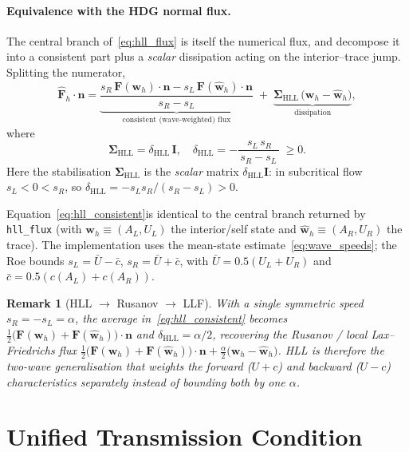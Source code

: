 \documentclass[11pt]{article}
\newtheorem{remark}[theorem]{Remark}
\begin{document}
\paragraph{Equivalence with the HDG normal flux.}
The central branch of~\eqref{eq:hll_flux} is itself the numerical flux, and decompose it into a consistent part plus a \emph{scalar}
dissipation acting on the interior--trace jump. Splitting the
numerator,
\begin{equation}
  \widehat{\mathbf F}_h\cdot\bm n
  =
  \underbrace{\frac{s_R\,\mathbf F(\mathbf w_h)\cdot\bm n
            -s_L\,\mathbf F(\widehat{\mathbf w}_h)\cdot\bm n}{s_R-s_L}}
            _{\text{consistent (wave-weighted) flux}}
  \;+\; \underbrace{\bm\Sigma_{\mathrm{HLL}}\,
  \bigl(\mathbf w_h-\widehat{\mathbf w}_h\bigr)}_{\text{dissipation}}, 
  \label{eq:hll_consistent}
\end{equation}
where $$
  \bm\Sigma_{\mathrm{HLL}}=\delta_{\mathrm{HLL}}\,\mathbf I,
  \quad
  \delta_{\mathrm{HLL}}= -\frac{\,s_L\,s_R}{\,s_R-s_L\,}\;\ge 0 .$$
Here the stabilisation $\bm\Sigma_{\mathrm{HLL}}$ is the \emph{scalar} matrix
$\delta_{\mathrm{HLL}}\mathbf I$: in subcritical flow $s_L<0<s_R$, so
$\delta_{\mathrm{HLL}}=-s_Ls_R/(s_R-s_L)>0$. 

Equation~\eqref{eq:hll_consistent}is identical to
the central branch returned by \texttt{hll\_flux} (with $\mathbf
w_h\equiv(A_L,U_L)$ the interior/self state and $\widehat{\mathbf
w}_h\equiv(A_R,U_R)$ the trace). The implementation uses the mean-state estimate~\eqref{eq:wave_speeds}; the
Roe bounds $s_L= \bar{U} - \bar{c}$, $s_R=\bar{U} + \bar{c}$, with $\bar{U} = 0.5(U_L + U_R) $ and $\bar{c} = 0.5(c(A_L)+c(A_R))$.
 

\begin{remark}[HLL $\to$ Rusanov $\to$ LLF]
With a single symmetric speed $s_R=-s_L=\alpha$, the average
in~\eqref{eq:hll_consistent} becomes $\tfrac12\bigl(\mathbf F(\mathbf
w_h)+\mathbf F(\widehat{\mathbf w}_h)\bigr)\cdot\bm n$ and
$\delta_{\mathrm{HLL}}=\alpha/2$, recovering the Rusanov / local
Lax--Friedrichs flux
$\tfrac12\bigl(\mathbf F(\mathbf w_h)+\mathbf F(\widehat{\mathbf
w}_h)\bigr)\cdot\bm n+\tfrac{\alpha}{2}\bigl(\mathbf w_h-\widehat{\mathbf
w}_h\bigr)$. HLL is therefore the two-wave generalisation that weights the
forward ($U+c$) and backward ($U-c$) characteristics separately instead of bounding both by one $\alpha$.
\end{remark}

\section{Unified Transmission Condition}
\end{document}
